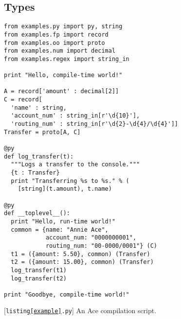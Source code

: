 \documentclass[10pt,preprint]{sigplanconf}
\begin{document}
\subsection{Types}
\begin{codelisting}
\begin{lstlisting}
from examples.py import py, string
from examples.fp import record
from examples.oo import proto
from examples.num import decimal
from examples.regex import string_in

print "Hello, compile-time world!"

A = record['amount' : decimal[2]]
C = record[
  'name' : string, 
  'account_num' : string_in[r'\d{10}'],
  'routing_num' : string_in[r'\d{2}-\d{4}/\d{4}']]
Transfer = proto[A, C]

@py
def log_transfer(t):
  """Logs a transfer to the console."""
  {t : Transfer}
  print "Transferring %s to %s." % (
    [string](t.amount), t.name)

@py
def __toplevel__():
  print "Hello, run-time world!"
  common = {name: "Annie Ace", 
            account_num: "0000000001", 
            routing_num: "00-0000/0001"} (C)
  t1 = ({amount: 5.50}, common) (Transfer)
  t2 = ({amount: 15.00}, common) (Transfer)
  log_transfer(t1)
  log_transfer(t2)

print "Goodbye, compile-time world!"
\end{lstlisting}
\caption{[\texttt{listing\ref{example}.py}] An Ace compilation script.}
\label{example}
\end{codelisting}
\end{document}

